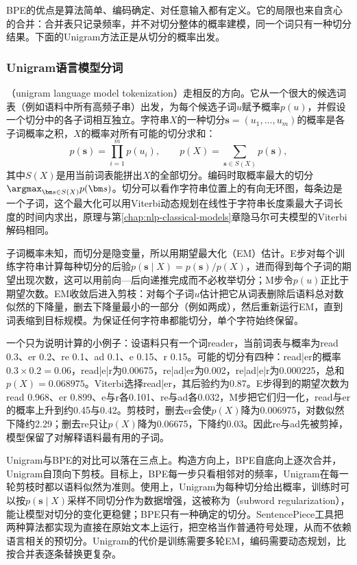 BPE的优点是算法简单、编码确定、对任意输入都有定义。它的局限也来自贪心的合并：合并表只记录频率，并不对切分整体的概率建模，同一个词只有一种切分结果。下面的Unigram方法正是从切分的概率出发。

\subsubsection{Unigram语言模型分词}
\label{sec:nlp-llm-unigram}

（unigram language model tokenization）走相反的方向。它从一个很大的候选词表（例如语料中所有高频子串）出发，为每个候选子词$u$赋予概率$p(u)$，并假设一个切分中的各子词相互独立。字符串$X$的一种切分$\bm s=(u_1,\ldots,u_m)$的概率是各子词概率之积，$X$的概率对所有可能的切分求和：
\begin{equation}
  p(\bm s)=\prod_{i=1}^{m}p(u_i),\qquad
  p(X)=\sum_{\bm s\in S(X)}p(\bm s),
  \label{eq:nlp-llm-unigram}
\end{equation}
其中$S(X)$是用当前词表能拼出$X$的全部切分。编码时取概率最大的切分$\argmax_{\bm s\in S(X)}p(\bm s)$。切分可以看作字符串位置上的有向无环图，每条边是一个子词，这个最大化可以用Viterbi动态规划在线性于字符串长度乘最大子词长度的时间内求出，原理与第\ref{chap:nlp-classical-models}章隐马尔可夫模型的Viterbi解码相同。

子词概率未知，而切分是隐变量，所以用期望最大化（EM）估计。E步对每个训练字符串计算每种切分的后验$p(\bm s\mid X)=p(\bm s)/p(X)$，进而得到每个子词的期望出现次数，这可以用前向—后向递推完成而不必枚举切分；M步令$p(u)$正比于期望次数。EM收敛后进入剪枝：对每个子词$u$估计把它从词表删除后语料总对数似然的下降量，删去下降量最小的一部分（例如两成），然后重新运行EM，直到词表缩到目标规模。为保证任何字符串都能切分，单个字符始终保留。

一个只为说明计算的小例子：设语料只有一个词reader，当前词表与概率为read 0.3、er 0.2、re 0.1、ad 0.1、e 0.15、r 0.15。可能的切分有四种：read|er的概率$0.3\times0.2=0.06$，read|e|r为0.00675，re|ad|er为0.002，re|ad|e|r为0.000225，总和$p(X)=0.068975$。Viterbi选择read|er，其后验约为0.87。E步得到的期望次数为read 0.968、er 0.899、e与r各0.101、re与ad各0.032，M步把它们归一化，read与er的概率上升到约0.45与0.42。剪枝时，删去er会使$p(X)$降为0.006975，对数似然下降约2.29；删去re只让$p(X)$降为0.06675，下降约0.03。因此re与ad先被剪掉，模型保留了对解释语料最有用的子词。

Unigram与BPE的对比可以落在三点上。构造方向上，BPE自底向上逐次合并，Unigram自顶向下剪枝。目标上，BPE每一步只看相邻对的频率，Unigram在每一轮剪枝时都以语料似然为准则。使用上，Unigram为每种切分给出概率，训练时可以按$p(\bm s\mid X)$采样不同切分作为数据增强，这被称为（subword regularization），能让模型对切分的变化更稳健；BPE只有一种确定的切分。SentencePiece工具把两种算法都实现为直接在原始文本上运行，把空格当作普通符号处理，从而不依赖语言相关的预切分。Unigram的代价是训练需要多轮EM，编码需要动态规划，比按合并表逐条替换更复杂。

